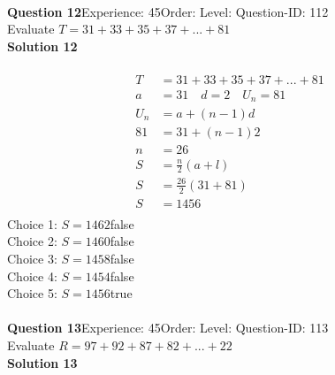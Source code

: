 \documentclass{article}
\begin{document}
\\[4pt]
\noindent\textbf{Question 12}\hspace{20pt}Experience: 45\hspace{20pt}Order: \hspace{20pt}Level: \hspace{20pt}Question-ID: 112\\[2pt]
Evaluate $T=31+33+35+37+...+81$\\[4pt]
\noindent\textbf{Solution 12}\\[2pt]
\\[-35pt]\begin{align*}
T&=31+33+35+37+...+81\\[2pt]
a&=31\quad d=2 \quad U_n=81\\[2pt]
U_n&=a+(n-1)d\\[2pt]
81&=31+(n-1)2\\[2pt]
n&=26\\[12pt]
S&=\displaystyle\frac{n}{2}(a+l)\\[2pt]
S&=\displaystyle\frac{26}{2}(31+81)\\[2pt]
S&=1456\\[-140pt]
\end{align*}
Choice 1: \hspace{20pt}$S=1462$\hspace{20pt}false\\
Choice 2: \hspace{20pt}$S=1460$\hspace{20pt}false\\
Choice 3: \hspace{20pt}$S=1458$\hspace{20pt}false\\
Choice 4: \hspace{20pt}$S=1454$\hspace{20pt}false\\
Choice 5: \hspace{20pt}$S=1456$\hspace{20pt}true\\
\\[4pt]
\noindent\textbf{Question 13}\hspace{20pt}Experience: 45\hspace{20pt}Order: \hspace{20pt}Level: \hspace{20pt}Question-ID: 113\\[2pt]
Evaluate $R=97+92+87+82+...+22$\\[4pt]
\noindent\textbf{Solution 13}\\[2pt]
\end{document}
